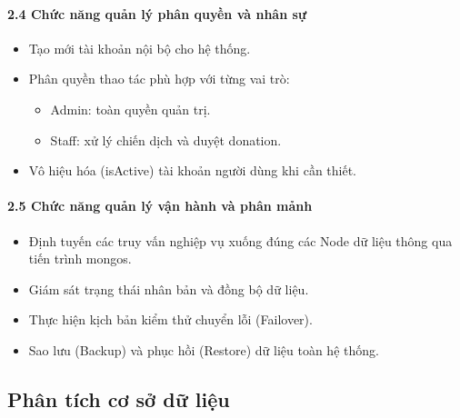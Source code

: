 \documentclass[12pt,a4paper]{article}
\begin{document}
\paragraph{2.4 Chức năng quản lý phân quyền và nhân sự} \mbox{}

\begin{itemize}
    \item Tạo mới tài khoản nội bộ cho hệ thống. 
    \item Phân quyền thao tác phù hợp với từng vai trò: 
        \begin{itemize}
        \item Admin: toàn quyền quản trị.
        \item Staff: xử lý chiến dịch và duyệt donation. 
        \end{itemize}
    \item Vô hiệu hóa (isActive) tài khoản người dùng khi cần thiết.
\end{itemize}

\paragraph{2.5 Chức năng quản lý vận hành và phân mảnh} \mbox{} 

\begin{itemize}
    \item Định tuyến các truy vấn nghiệp vụ xuống đúng các Node dữ liệu thông qua tiến trình mongos. 
    \item Giám sát trạng thái nhân bản và đồng bộ dữ liệu.
    \item Thực hiện kịch bản kiểm thử chuyển lỗi (Failover).
    \item Sao lưu (Backup) và phục hồi (Restore) dữ liệu toàn hệ thống.
\end{itemize}

\subsection{Phân tích cơ sở dữ liệu}
\end{document}
